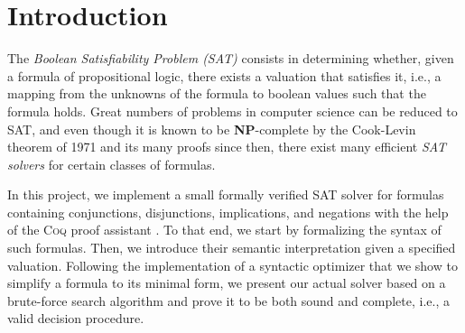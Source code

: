 \section{Introduction}\label{sec:intro}

The \emph{Boolean Satisfiability Problem (SAT)} consists in determining whether, given a formula of propositional logic, there exists a valuation that satisfies it, i.e., a mapping from the unknowns of the formula to boolean values such that the formula holds. 
Great numbers of problems in computer science can be reduced to SAT, and even though it is known to be \textbf{NP}-complete by the Cook-Levin theorem of 1971 \cite{cook1971} and its many proofs since then, there exist many efficient \emph{SAT solvers} for certain classes of formulas.

In this project, we implement a small formally verified SAT solver for formulas containing conjunctions, disjunctions, implications, and negations with the help of the \textsc{Coq} proof assistant \cite{coq_ref_man}. 
To that end, we start by formalizing the syntax of such formulas. 
Then, we introduce their semantic interpretation given a specified valuation. 
Following the implementation of a syntactic optimizer that we show to simplify a formula to its minimal form, we present our actual solver based on a brute-force search algorithm and prove it to be both sound and complete, i.e., a valid decision procedure.